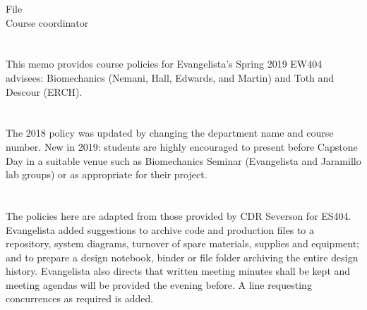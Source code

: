 \documentclass[10pt,courier]{navymemo}
\begin{document}
\copyto{}
File\\
Course coordinator


\navyrecordnote
\thispagestyle{empty}

%

\navyrecordnotesubjline

\section{}  This memo provides course policies for Evangelista's Spring 2019 EW404 advisees: Biomechanics (Nemani, Hall, Edwards, and Martin) and Toth and Descour (ERCH). 

\section{} The 2018 policy was updated by changing the department name and course number. New in 2019: students are highly encouraged to present before Capstone Day in a suitable venue such as Biomechanics Seminar (Evangelista and Jaramillo lab groups) or as appropriate for their project. 

\section{}  The policies here are adapted from those provided by CDR Severson for ES404.  Evangelista added suggestions to archive code and production files to a repository, system diagrams, turnover of spare materials, supplies and equipment; and to prepare a design notebook, binder or file folder archiving the entire design history.  Evangelista also directs that written meeting minutes shall be kept and meeting agendas will be provided the evening before. A line requesting concurrences as required is added.

\end{document}
